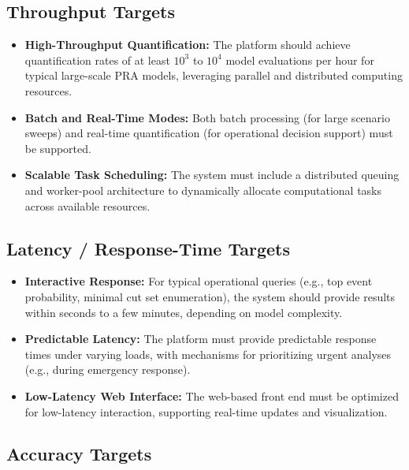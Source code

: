 \subsection{Throughput Targets}
\label{subsec:throughput-targets}

\begin{itemize}
    \item \textbf{High-Throughput Quantification:} The platform should achieve quantification rates of at least $10^3$ to $10^4$ model evaluations per hour for typical large-scale PRA models, leveraging parallel and distributed computing resources.
    \item \textbf{Batch and Real-Time Modes:} Both batch processing (for large scenario sweeps) and real-time quantification (for operational decision support) must be supported.
    \item \textbf{Scalable Task Scheduling:} The system must include a distributed queuing and worker-pool architecture to dynamically allocate computational tasks across available resources.
\end{itemize}

\subsection{Latency / Response-Time Targets}
\label{subsec:latency-targets}

\begin{itemize}
    \item \textbf{Interactive Response:} For typical operational queries (e.g., top event probability, minimal cut set enumeration), the system should provide results within seconds to a few minutes, depending on model complexity.
    \item \textbf{Predictable Latency:} The platform must provide predictable response times under varying loads, with mechanisms for prioritizing urgent analyses (e.g., during emergency response).
    \item \textbf{Low-Latency Web Interface:} The web-based front end must be optimized for low-latency interaction, supporting real-time updates and visualization.
\end{itemize}

\subsection{Accuracy Targets}
\label{subsec:accuracy-targets}

